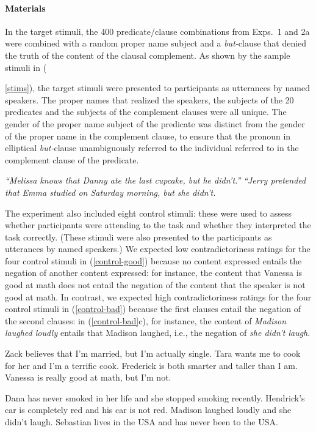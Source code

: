 \documentclass[11pt,fleqn]{article}
\newcommand{\6}{\mbox{$[\hspace*{-.6mm}[$}}
\newcommand{\9}{\mbox{$]\hspace*{-.6mm}]$}}
\begin{document}
\paragraph{Materials} In the target stimuli, the 400 predicate/clause combinations from Exps.~1 and 2a were combined with a random proper name subject and a {\em but-}clause that denied the truth of the content of the clausal complement. As shown by the sample stimuli in ({\ref{stims}), the target stimuli were presented to participants as utterances by named speakers. The proper names that realized the speakers, the subjects of the 20 predicates and the subjects of the complement clauses were all unique. The gender of the proper name subject of the predicate was distinct from the gender of the proper name in the complement clause, to ensure that the pronoun in elliptical {\em but-}clause unambiguously referred to the individual referred to in the complement clause of the predicate.

\begin{exe}
\ex\label{stims}
\begin{xlist}
 {\em ``Melissa knows that Danny ate the last cupcake, but he didn't.''}
 {\em ``Jerry pretended that Emma studied on Saturday morning, but she didn't.}
\end{xlist}
\end{exe}

The experiment also included eight control stimuli: these were used to assess whether participants were attending to the task and whether they interpreted the task correctly. (These stimuli were also presented to the participants as utterances by named speakers.) We expected low contradictoriness ratings for the four control stimuli in (\ref{control-good}) because no content expressed entails the negation of another content expressed: for instance, the content that Vanessa is good at math does not entail the negation of the content that the speaker is not good at math. In contrast, we expected high contradictoriness ratings for the four control stimuli in (\ref{control-bad}) because the first clauses entail the negation of the second clauses: in (\ref{control-bad}c), for instance, the content of {\em Madison laughed loudly} entails that Madison laughed, i.e., the negation of {\em she didn't laugh}.

\begin{exe}
\ex\label{control-good}
\begin{xlist}
\ex Zack believes that I'm married, but I'm actually single.
\ex Tara wants me to cook for her and I'm a terrific cook.
\ex Frederick is both smarter and taller than I am.
\ex Vanessa is really good at math, but I'm not.
\end{xlist}
\ex\label{control-bad}
\begin{xlist}
\ex Dana has never smoked in her life and she stopped smoking recently.
\ex Hendrick's car is completely red and his car is not red.
\ex Madison laughed loudly and she didn't laugh.
\ex Sebastian lives in the USA and has never been to the USA.
\end{xlist}
\end{exe}

}
\end{document}

